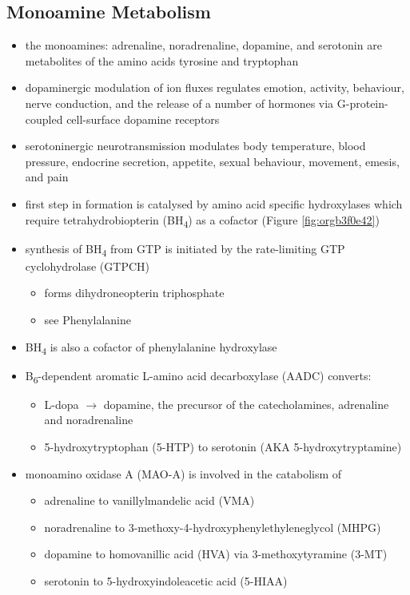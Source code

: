 \documentclass[12pt]{scrartcl}
\begin{document}
\subsection{Monoamine Metabolism}
\label{sec:orgffac3ce}
\begin{itemize}
\item the monoamines: adrenaline, noradrenaline, dopamine, and serotonin
are metabolites of the amino acids tyrosine and tryptophan
\item dopaminergic modulation of ion fluxes regulates emotion, activity,
behaviour, nerve conduction, and the release of a number of hormones
via G-protein-coupled cell-surface dopamine
receptors
\item serotoninergic neurotransmission modulates body temperature, blood
pressure, endocrine secretion, appetite, sexual behaviour, movement,
emesis, and pain
\item first step in formation is catalysed by amino acid specific
hydroxylases which require tetrahydrobiopterin (BH\textsubscript{4}) as a cofactor
(Figure \ref{fig:orgb3f0e42})
\item synthesis of BH\textsubscript{4} from GTP is initiated by the rate-limiting GTP
cyclohydrolase (GTPCH)
\begin{itemize}
\item forms dihydroneopterin triphosphate
\item see Phenylalanine
\end{itemize}
\item BH\textsubscript{4} is also a cofactor of phenylalanine hydroxylase
\item B\textsubscript{6}-dependent aromatic L-amino acid decarboxylase (AADC) converts:
\begin{itemize}
\item L-dopa \(\to\) dopamine, the precursor of the catecholamines,
adrenaline and noradrenaline
\item 5-hydroxytryptophan (5-HTP) to serotonin (AKA 5-hydroxytryptamine)
\end{itemize}
\item monoamino oxidase A (MAO-A) is involved in the catabolism of
\begin{itemize}
\item adrenaline to vanillylmandelic acid (VMA)
\item noradrenaline to 3-methoxy-4-hydroxyphenylethyleneglycol (MHPG)
\item dopamine to homovanillic acid (HVA) via 3-methoxytyramine (3-MT)
\item serotonin to 5-hydroxyindoleacetic acid (5-HIAA)
\end{itemize}
\end{itemize}
\end{document}
